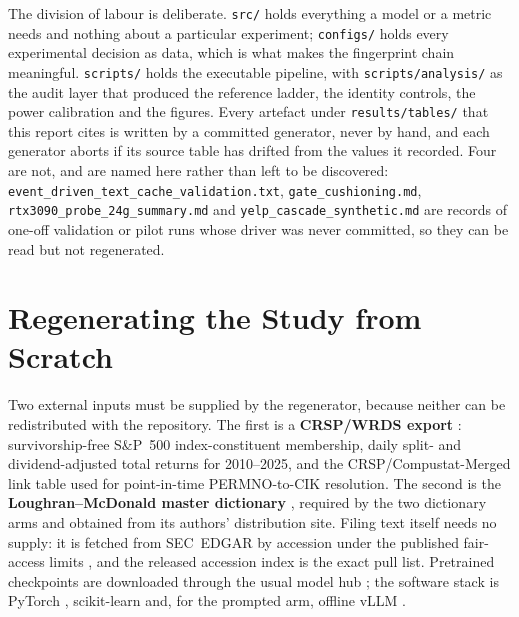 The division of labour is deliberate. \texttt{src/} holds everything a model or a
metric needs and nothing about a particular experiment; \texttt{configs/} holds
every experimental decision as data, which is what makes the fingerprint chain
meaningful. \texttt{scripts/} holds the executable pipeline, with
\texttt{scripts/analysis/} as the audit layer that produced the reference ladder,
the identity controls, the power calibration and the figures. Every artefact
under \texttt{results/tables/} that this report cites is written by a committed
generator, never by hand, and each generator aborts if its source table has
drifted from the values it recorded. Four are not, and are named here rather
than left to be discovered: \texttt{event\_driven\_text\_cache\_validation.txt},
\texttt{gate\_cushioning.md}, \texttt{rtx3090\_probe\_24g\_summary.md} and
\texttt{yelp\_cascade\_synthetic.md} are records of one-off validation or pilot
runs whose driver was never committed, so they can be read but not
regenerated. %

\FloatBarrier
\section{Regenerating the Study from Scratch}
\label{app:external:regen}

Two external inputs must be supplied by the regenerator, because neither can be
redistributed with the repository. The first is a \textbf{CRSP/WRDS export}
\cite{crsp2026data}: survivorship-free S\&P~500 index-constituent membership,
daily split- and dividend-adjusted total returns for 2010--2025, and the
CRSP/Compustat-Merged link table used for point-in-time PERMNO-to-CIK resolution.
The second is the \textbf{Loughran--McDonald master dictionary}
\cite{loughran2011liability}, required by the two dictionary arms and obtained
from its authors' distribution site. Filing text itself needs no supply: it is
fetched from SEC~EDGAR by accession under the published fair-access limits
\cite{sec2024edgar}, and the released accession index is the exact pull list.
Pretrained checkpoints \cite{araci2019finbert,beltagy2020longformer,devlin2019bert,liu2019roberta,qwen3_2025}
are downloaded through the usual model hub \cite{wolf2020transformers}; the
software stack is PyTorch \cite{paszke2019pytorch}, scikit-learn
\cite{pedregosa2011sklearn} and, for the prompted arm, offline vLLM
\cite{kwon2023vllm}.

